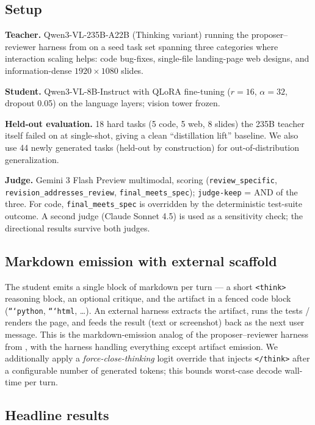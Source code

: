 \documentclass[11pt]{article}
\begin{document}
\subsection{Setup}
\label{sec:distill-setup}

\textbf{Teacher.} Qwen3-VL-235B-A22B (Thinking variant) running the proposer--reviewer harness from  on a seed task set spanning three categories where interaction scaling helps: code bug-fixes, single-file landing-page web designs, and information-dense $1920 \times 1080$ slides.

\textbf{Student.} Qwen3-VL-8B-Instruct with QLoRA fine-tuning ($r{=}16$, $\alpha{=}32$, dropout 0.05) on the language layers; vision tower frozen.

\textbf{Held-out evaluation.} 18 hard tasks (5 code, 5 web, 8 slides) the 235B teacher itself failed on at single-shot, giving a clean ``distillation lift'' baseline. We also use 44 newly generated tasks (held-out by construction) for out-of-distribution generalization.

\textbf{Judge.} Gemini 3 Flash Preview multimodal, scoring (\texttt{review\_specific}, \texttt{revision\_addresses\_review}, \texttt{final\_meets\_spec}); \texttt{judge-keep} = AND of the three. For code, \texttt{final\_meets\_spec} is overridden by the deterministic test-suite outcome. A second judge (Claude Sonnet 4.5) is used as a sensitivity check; the directional results survive both judges.

\subsection{Markdown emission with external scaffold}
\label{sec:distill-format}

The student emits a single block of markdown per turn --- a short \texttt{<think>} reasoning block, an optional critique, and the artifact in a fenced code block (\texttt{```python}, \texttt{```html}, \ldots). An external harness extracts the artifact, runs the tests / renders the page, and feeds the result (text or screenshot) back as the next user message. This is the markdown-emission analog of the proposer--reviewer harness from , with the harness handling everything except artifact emission. We additionally apply a \emph{force-close-thinking} logit override that injects \texttt{</think>} after a configurable number of generated tokens; this bounds worst-case decode wall-time per turn.

\subsection{Headline results}
\label{sec:distill-headline}
\end{document}
